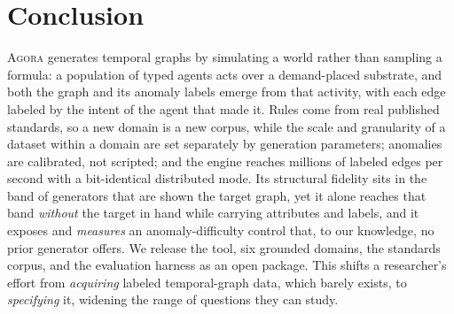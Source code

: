 \documentclass[sigconf,review,anonymous]{acmart}
\newcommand{\sys}{\textsc{Agora}\xspace}
\begin{document}
\section{Conclusion}
\sys{} generates temporal graphs by simulating a world rather than sampling a
formula: a population of typed agents acts over a demand-placed substrate, and both
the graph and its anomaly labels emerge from that activity, with each edge labeled
by the intent of the agent that made it. Rules come from real published standards,
so a new domain is a new corpus, while the scale and granularity of a dataset within a
domain are set separately by generation parameters; anomalies are calibrated, not
scripted; and the engine reaches millions of labeled edges per second with a
bit-identical distributed mode. Its structural fidelity sits in the band of generators that are
shown the target graph, yet it alone reaches that band \emph{without} the target in
hand while carrying attributes and labels, and it exposes and \emph{measures} an
anomaly-difficulty control that, to our knowledge, no prior generator offers. We release
the tool, six grounded domains, the standards corpus, and the evaluation harness as an
open package. This shifts a researcher's effort from \emph{acquiring} labeled
temporal-graph data, which barely exists, to \emph{specifying} it, widening the range of
questions they can study.



\end{document}
